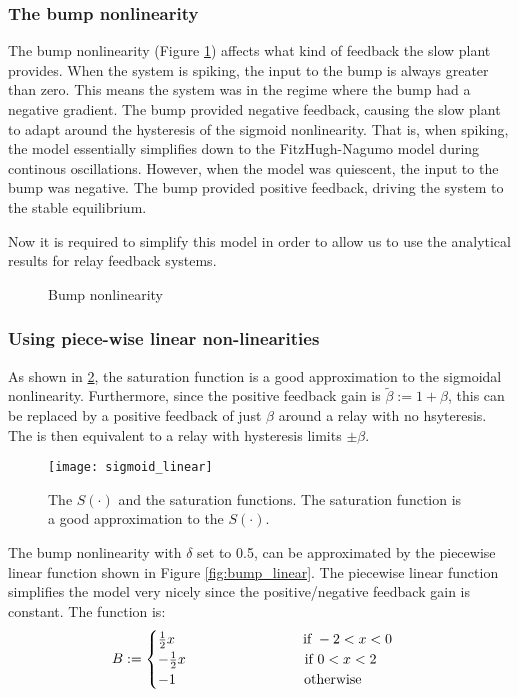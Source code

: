 \documentclass[a4paper, 12pt]{article}
\begin{document}
\subsubsection{The bump nonlinearity}
The bump nonlinearity (Figure \ref{fig:bump_nonlinearity}) affects what kind of feedback the slow plant provides. When the system is spiking, the input to the bump is always greater than zero. This means the system was in the regime where the bump had a negative gradient. The bump provided negative feedback, causing the slow plant to adapt around the hysteresis of the sigmoid nonlinearity. That is, when spiking, the model essentially simplifies down to the FitzHugh-Nagumo model during continous oscillations. However, when the model was quiescent, the input to the bump was negative. The bump provided positive feedback, driving the system to the stable equilibrium. 

Now it is required to simplify this model in order to allow us to use the analytical results for relay feedback systems.

\begin{figure}
\caption{Bump nonlinearity}
\label{fig:bump_nonlinearity}
\end{figure}
\FloatBarrier
\subsubsection{Using piece-wise linear non-linearities}
As shown in \ref{fig:sigmoid_linear}, the saturation function is a good approximation to the sigmoidal nonlinearity. Furthermore, since the positive feedback gain is $\tilde{\beta}:=1 + \beta$, this can be replaced by a positive feedback of just $\beta$ around a relay with no hsyteresis. The is then equivalent to a relay with hysteresis limits $\pm \beta$. 

\begin{figure}
\texttt{[image: sigmoid\_linear]}
\caption{The $S(\cdot)$ and the saturation functions. The saturation function is a good approximation to the $S(\cdot)$. }
\label{fig:sigmoid_linear}
\end{figure}

The bump nonlinearity with $\delta$ set to 0.5, can be approximated by the piecewise linear function shown in Figure \ref{fig:bump_linear}. The piecewise linear function simplifies the model very nicely since the positive/negative feedback gain is constant. The function is:
\begin{equation}
B:= \begin{cases}
\frac{1}{2}x \text{ \hspace{3cm}  if } -2<x<0 \\
-\frac{1}{2}x \text{\hspace{3cm}if } 0<x<2 \\
-1 \text{ \hspace{3cm}  otherwise}
\end{cases}
\end{equation}
\end{document}
